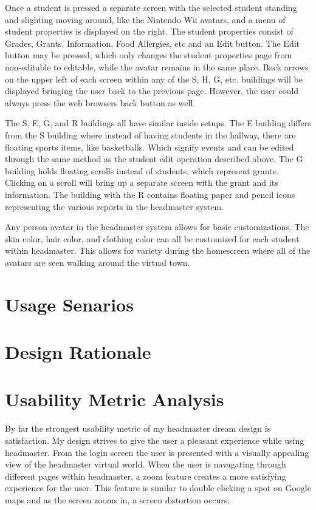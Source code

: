 \documentclass[11pt]{article}
\begin{document}
Once a student is pressed a separate screen with the selected student standing and slighting moving around, like the Nintendo Wii avatars, and a menu of student properties is displayed on the right. The student properties consist of Grades, Grants, Information, Food Allergies, etc and an Edit button. The Edit button may be pressed, which only changes the student properties page from non-editable to editable, while the avatar remains in the same place. Back arrows on the upper left of each screen within any of the S, H, G, etc. buildings will be displayed bringing the user back to the previous page. However, the user could always press the web browsers back button as well.

The S, E, G, and R buildings all have similar inside setups. The E building differs from the S building where instead of having students in the hallway, there are floating sports items, like basketballs. Which signify events and can be edited through the same method as the student edit operation described above. The G building holds floating scrolls instead of students, which represent grants. Clicking on a scroll will bring up a separate screen with the grant and its information. The building with the R contains floating paper and pencil icons representing the various reports in the headmaster system. 

Any person avatar in the headmaster system allows for basic customizations. The skin color, hair color, and clothing color can all be customized for each student within headmaster. This allows for variety during the homescreen where all of the avatars are seen walking around the virtual town.

\section{Usage Senarios}

\section{Design Rationale}

\section{Usability Metric Analysis}
By far the strongest usability metric of my headmaster dream design is satisfaction. My design strives to give the user a pleasant experience while using headmaster. From the login screen the user is presented with a visually appealing view of the headmaster virtual world. When the user is navagating through different pages within headmaster, a zoom feature creates a more satisfying experience for the user. This feature is similar to double clicking a spot on Google maps and as the screen zooms in, a screen distortion occurs.
\end{document}
